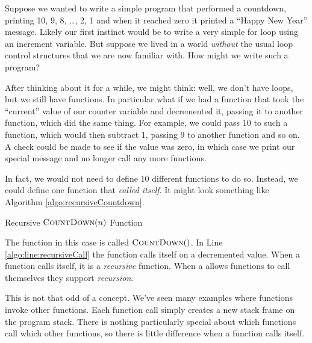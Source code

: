

Suppose we wanted to write a simple program that performed a 
countdown, printing
10, 9, 8, \ldots, 2, 1 and when it reached zero it printed a ``Happy
New Year'' message.  Likely our first instinct would be to write a 
very simple for loop using an increment variable.  But suppose
we lived in a world \emph{without} the usual loop control structures 
that we are now
familiar with.  How might we write such a program?

After thinking about it for a while, we might think: well, we don't have
loops, but we still have functions.  In particular what if we had a function
that took the ``current'' value of our counter variable and decremented it, 
passing it to another function, which did the same thing.  For example, we 
could pass 10 to such a function, which would then subtract 1, passing 9
to another function and so on.  A check could be made to see if the value was 
zero, in which case we print our special message and no longer call any more 
functions.

In fact, we would not need to define 10 different functions to do so.  Instead, 
we could define one function that \emph{called itself}.  It might look something
like Algorithm \ref{algo:recursiveCountdown}.

\begin{algorithm}[H]
 
\caption{Recursive $\textsc{CountDown}(n)$ Function}
\label{algo:recursiveCountdown}
\end{algorithm}

The function in this case is called $\textsc{CountDown}()$.  In Line 
\ref{algo:line:recursiveCall} the function calls itself on a decremented
value.  When a function calls itself, it is a \emph{recursive} function.
When a allows functions to call themselves they support \emph{recursion}.

This is not that odd of a concept.  We've seen many examples where functions
invoke other functions.  Each function call simply creates
a new stack frame on the program stack.  There is nothing particularly special
about which functions call which other functions, so there is little
difference when a function calls itself. 


